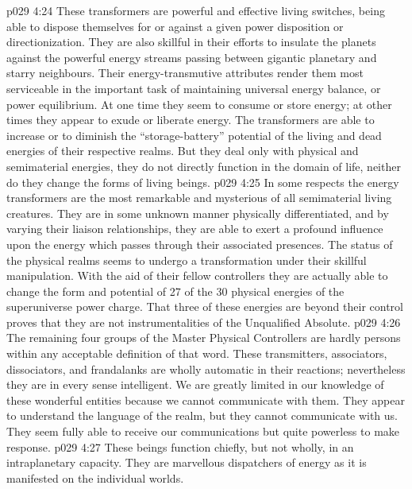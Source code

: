 \vs p029 4:24 These transformers are powerful and effective living switches, being able to dispose themselves for or against a given power disposition or directionization. They are also skillful in their efforts to insulate the planets against the powerful energy streams passing between gigantic planetary and starry neighbours. Their energy\hyp{}transmutive attributes render them most serviceable in the important task of maintaining universal energy balance, or power equilibrium. At one time they seem to consume or store energy; at other times they appear to exude or liberate energy. The transformers are able to increase or to diminish the “storage\hyp{}battery” potential of the living and dead energies of their respective realms. But they deal only with physical and semimaterial energies, they do not directly function in the domain of life, neither do they change the forms of living beings.
\vs p029 4:25 In some respects the energy transformers are the most remarkable and mysterious of all semimaterial living creatures. They are in some unknown manner physically differentiated, and by varying their liaison relationships, they are able to exert a profound influence upon the energy which passes through their associated presences. The status of the physical realms seems to undergo a transformation under their skillful manipulation.  With the aid of their fellow controllers they are actually able to change the form and potential of 27 of the 30 physical energies of the superuniverse power charge. That three of these energies are beyond their control proves that they are not instrumentalities of the Unqualified Absolute.
\vs p029 4:26 \pc The remaining four groups of the Master Physical Controllers are hardly persons within any acceptable definition of that word. These transmitters, associators, dissociators, and frandalanks are wholly automatic in their reactions; nevertheless they are in every sense intelligent. We are greatly limited in our knowledge of these wonderful entities because we cannot communicate with them. They appear to understand the language of the realm, but they cannot communicate with us. They seem fully able to receive our communications but quite powerless to make response.
\vs p029 4:27 \bibnobreakspace {} These beings function chiefly, but not wholly, in an intraplanetary capacity. They are marvellous dispatchers of energy as it is manifested on the individual worlds.
